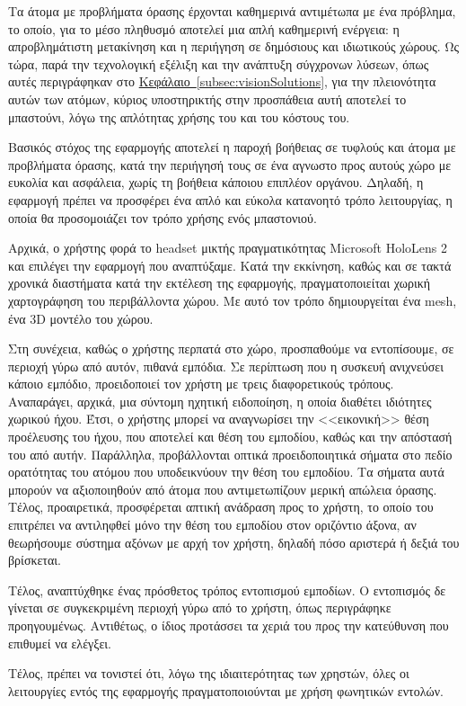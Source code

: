 Τα άτομα με προβλήματα όρασης έρχονται καθημερινά αντιμέτωπα με ένα πρόβλημα, το οποίο, για το μέσο πληθυσμό αποτελεί μια απλή καθημερινή ενέργεια: η απροβλημάτιστη μετακίνηση και η περιήγηση σε δημόσιους και ιδιωτικούς χώρους. Ως τώρα, παρά την τεχνολογική εξέλιξη και την ανάπτυξη σύγχρονων λύσεων, όπως αυτές περιγράφηκαν στο \hyperref[subsec:visionSolutions]{Κεφάλαιο~\ref*{subsec:visionSolutions}}, για την πλειονότητα αυτών των ατόμων, κύριος υποστηρικτής στην προσπάθεια αυτή αποτελεί το μπαστούνι, λόγω της απλότητας χρήσης του και του κόστους του.

Βασικός στόχος της εφαρμογής αποτελεί η παροχή βοήθειας σε τυφλούς και άτομα με προβλήματα όρασης, κατά την περιήγησή τους σε ένα αγνωστο προς αυτούς χώρο με ευκολία και ασφάλεια, χωρίς τη βοήθεια κάποιου επιπλέον οργάνου. Δηλαδή, η εφαρμογή πρέπει να προσφέρει ένα απλό και εύκολα κατανοητό τρόπο λειτουργίας, η οποία θα προσομοιάζει τον τρόπο χρήσης ενός μπαστονιού.

Αρχικά, ο χρήστης φορά το headset μικτής πραγματικότητας Microsoft HoloLens 2 και επιλέγει την εφαρμογή που αναπτύξαμε. Κατά την εκκίνηση, καθώς και σε τακτά χρονικά διαστήματα κατά την εκτέλεση της εφαρμογής, πραγματοποιείται χωρική χαρτογράφηση του περιβάλλοντα χώρου. Με αυτό τον τρόπο δημιουργείται ένα mesh, ένα 3D μοντέλο του χώρου.

Στη συνέχεια, καθώς ο χρήστης περπατά στο χώρο, προσπαθούμε να εντοπίσουμε, σε περιοχή γύρω από αυτόν, πιθανά εμπόδια. Σε περίπτωση που η συσκευή ανιχνεύσει κάποιο εμπόδιο, προειδοποιεί τον χρήστη με τρεις διαφορετικούς τρόπους. Αναπαράγει, αρχικά, μια σύντομη ηχητική ειδοποίηση, η οποία διαθέτει ιδιότητες χωρικού ήχου. Έτσι, ο χρήστης μπορεί να αναγνωρίσει την <<εικονική>> θέση προέλευσης του ήχου, που αποτελεί και θέση του εμποδίου, καθώς και την απόστασή του από αυτήν. Παράλληλα, προβάλλονται οπτικά προειδοποιητικά σήματα στο πεδίο ορατότητας του ατόμου που υποδεικνύουν την θέση του εμποδίου. Τα σήματα αυτά μπορούν να αξιοποιηθούν από άτομα που αντιμετωπίζουν μερική απώλεια όρασης. Τέλος, προαιρετικά, προσφέρεται απτική ανάδραση προς το χρήστη, το οποίο του επιτρέπει να αντιληφθεί μόνο την θέση του εμποδίου στον οριζόντιο άξονα, αν θεωρήσουμε σύστημα αξόνων με αρχή τον χρήστη, δηλαδή πόσο αριστερά ή δεξιά του βρίσκεται.

Τέλος, αναπτύχθηκε ένας πρόσθετος τρόπος εντοπισμού εμποδίων. Ο εντοπισμός δε γίνεται σε συγκεκριμένη περιοχή γύρω από το χρήστη, όπως περιγράφηκε προηγουμένως. Αντιθέτως, ο ίδιος προτάσσει τα χεριά του προς την κατεύθυνση που επιθυμεί να ελέγξει.

Τέλος, πρέπει να τονιστεί ότι, λόγω της ιδιαιτερότητας των χρηστών, όλες οι λειτουργίες εντός της εφαρμογής πραγματοποιούνται με χρήση φωνητικών εντολών.